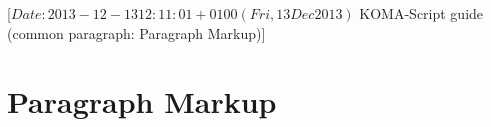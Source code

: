 %
%
%
%
%
%
%
%
% 
%
%
%
%

                 [$Date: 2013-12-13 12:11:01 +0100 (Fri, 13 Dec 2013) $
                  KOMA-Script guide (common paragraph: Paragraph Markup)]


\makeatletter
{}%
%
%
%
\makeatother


\section{Paragraph Markup}
\label{sec:\csname label@base\endcsname.parmarkup}%
\ifshortversion\IgnoreThisfalse{}\fi%
\ifIgnoreThis %
\else %
%


